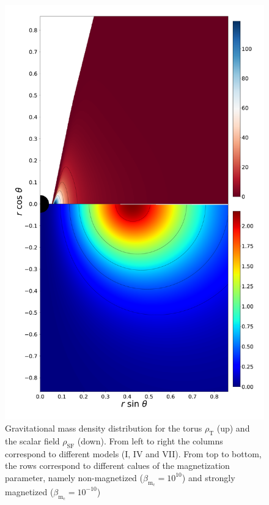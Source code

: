 \documentclass[twocolumn,aps,showpacs,showkeys,prd,superscriptaddress,byrevtex, amsmath]{revtex4-1}
\begin{document}
\begin{figure}
\includegraphics[scale=0.12]{figures/fig5_VII__10.pdf}
\hspace{-0.2cm}
\caption{Gravitational mass density distribution for the torus $\rho_{\mathrm{T}}$ (up) and the scalar field $\rho_{\mathrm{SF}}$ (down). From left to right the columns correspond to different models (I, IV and VII). From top to bottom, the rows correspond to different calues of the magnetization parameter, namely non-magnetized ($\beta_{\mathrm{m}_{\mathrm{c}}} = 10^{10}$) and strongly magnetized ($\beta_{\mathrm{m}_{\mathrm{c}}} = 10^{-10}$)}
\label{comparison_mass_density}
\end{figure}
\end{document}
